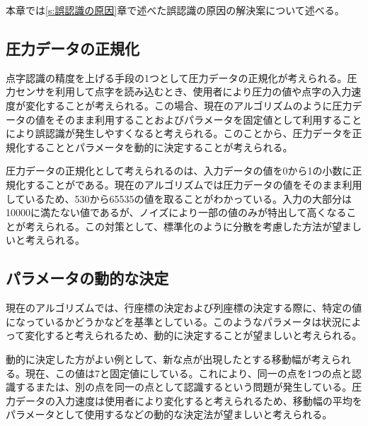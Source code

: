 本章では\ref{s:誤認識の原因}章で述べた誤認識の原因の解決案について述べる。

\subsection{圧力データの正規化}
点字認識の精度を上げる手段の1つとして圧力データの正規化が考えられる。圧力センサを利用して点字を読み込むとき、使用者により圧力の値や点字の入力速度が変化することが考えられる。この場合、現在のアルゴリズムのように圧力データの値をそのまま利用することおよびパラメータを固定値として利用することにより誤認識が発生しやすくなると考えられる。このことから、圧力データを正規化することとパラメータを動的に決定することが考えられる。

圧力データの正規化として考えられるのは、入力データの値を0から1の小数に正規化することがである。現在のアルゴリズムでは圧力データの値をそのまま利用しているため、530から65535の値を取ることがわかっている。入力の大部分は10000に満たない値であるが、ノイズにより一部の値のみが特出して高くなることが考えられる。この対策として、標準化のように分散を考慮した方法が望ましいと考えられる。

\subsection{パラメータの動的な決定}
現在のアルゴリズムでは、行座標の決定および列座標の決定する際に、特定の値になっているかどうかなどを基準としている。このようなパラメータは状況によって変化すると考えられるため、動的に決定することが望ましいと考えられる。

動的に決定した方がよい例として、新な点が出現したとする移動幅が考えられる。現在、この値は7と固定値にしている。これにより、同一の点を1つの点と認識するまたは、別の点を同一の点として認識するという問題が発生している。圧力データの入力速度は使用者により変化すると考えられるため、移動幅の平均をパラメータとして使用するなどの動的な決定法が望ましいと考えられる。

